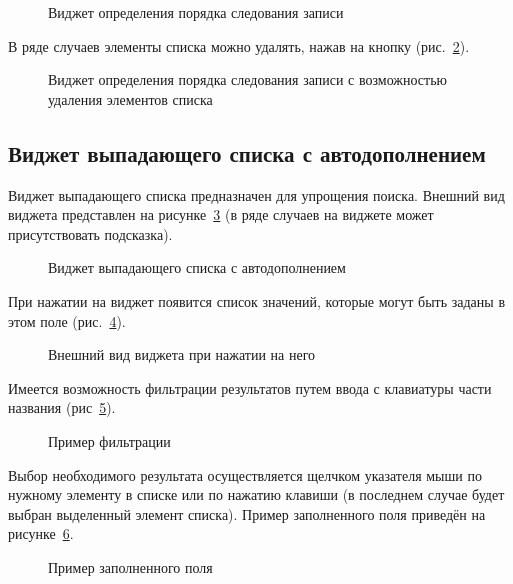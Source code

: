 \begin{figure}[H]
	\caption{Виджет определения порядка следования записи}
	\label{img:widgect:ordered_list}
\end{figure}

В ряде случаев элементы списка можно удалять, нажав на кнопку  (рис.~\ref{img:widgect:ordered_list_with_delete}).

\begin{figure}[H]
	\caption{Виджет определения порядка следования записи с возможностью удаления элементов списка}
	\label{img:widgect:ordered_list_with_delete}
\end{figure}
\subsection{Виджет выпадающего списка с автодополнением}
\label{widget:autocomplete}
Виджет выпадающего списка предназначен для упрощения поиска. Внешний вид виджета представлен на рисунке~\ref{img:widgect:autocomplete_view} (в ряде случаев на виджете может присутствовать подсказка).
\begin{figure}[H]
	\caption{Виджет выпадающего списка с автодополнением}
	\label{img:widgect:autocomplete_view}
\end{figure}

При нажатии на виджет появится список значений, которые могут быть заданы в этом поле (рис.~\ref{img:widgect:autocomplete_open_view}).
\begin{figure}[H]
	\caption{Внешний вид виджета при нажатии на него}
	\label{img:widgect:autocomplete_open_view}
\end{figure}

Имеется возможность фильтрации результатов путем ввода с клавиатуры части названия (рис~\ref{img:widgect:autocomplete_filter_view}).
\begin{figure}[H]
	\caption{Пример фильтрации}
	\label{img:widgect:autocomplete_filter_view}
\end{figure}

Выбор необходимого результата осуществляется щелчком указателя мыши по нужному элементу в списке или по нажатию клавиши \keys{\enter} (в последнем случае будет выбран выделенный элемент списка). Пример заполненного поля приведён на рисунке~\ref{img:widgect:autocomplete_complete}.
\begin{figure}[H]
	\caption{Пример заполненного поля}
	\label{img:widgect:autocomplete_complete}
\end{figure}

